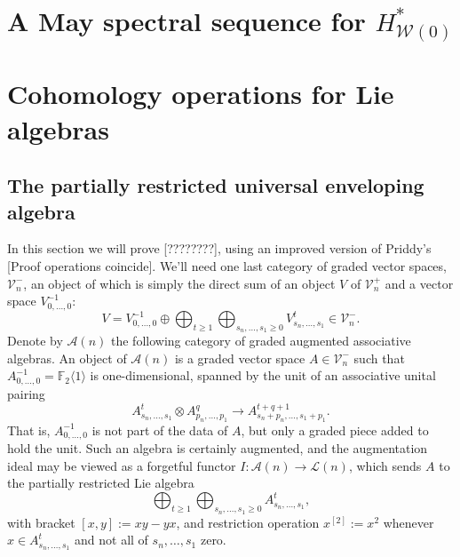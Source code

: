 \documentclass[11pt]{amsart}
\theoremstyle{plain}
\theoremstyle{definition}
\renewcommand{\to}{\longrightarrow}
\newcommand{\calW}{\mathcal{W}}
\newcommand{\calA}{\mathcal{A}}
\newcommand{\calL}{\mathcal{L}}
\newcommand{\calV}{\mathcal{V}}
\theoremstyle{plain}
\newcommand{\restn}[1]{#1^{[2]}}
\newcommand{\vect}[2]{\calV^{#1}_{#2}}
\newcommand{\F}{\mathbb{F}}
\begin{document}
\appendix
\begin{appendices}
\vfil\pagebreak

\section{\textbf{A May spectral sequence for $H^*_{\calW(0)}$}}

\section{\textbf{Cohomology operations for Lie algebras}}\label{appendix on Lie coh ops}
\subsection{The partially restricted universal enveloping algebra}
In this section we will prove [????????], using an improved version of Priddy's [Proof operations coincide]. We'll need one last category of graded vector spaces, $\vect{-}{n}$, an object of which is simply the direct sum of an object $V$ of $\vect{+}{n}$ and a vector space $V_{0,\ldots,0}^{-1}$:
\[V=V^{-1}_{0,\ldots,0}\oplus\bigoplus_{t\geq{1}}\bigoplus_{s_n,\ldots,s_1\geq0}V^t_{s_n,\ldots,s_1}\in\vect{-}{n}.\]
Denote by $\calA(n)$ the following category of graded augmented associative algebras. An object of $\calA(n)$ is a graded vector space
$A\in \vect{-}{n}$ such that $A^{-1}_{0,\ldots,0}=\F_2\langle 1\rangle$ is one-dimensional, spanned by the unit of an associative unital pairing
\[A^{t}_{s_n,\ldots,s_1}\otimes A^{q}_{p_n,\ldots,p_1}\to A^{t+q+1}_{s_n+p_n,\ldots,s_1+p_1}.\]
That is, $A_{0,\ldots,0}^{-1}$ is not part of the data of $A$, but only a graded piece added to hold the unit. Such an algebra is certainly augmented, and the augmentation ideal may be viewed as a forgetful functor $I:\calA(n)\to\calL(n)$, which sends $A$ to the partially restricted Lie algebra
\[\bigoplus_{t\geq{1}}\bigoplus_{s_n,\ldots,s_1\geq0}A^t_{s_n,\ldots,s_1},\]
with bracket $[x,y]:=xy-yx$, and restriction operation $\restn{x}:=x^2$ whenever $x\in A^t_{s_n,\ldots,s_1}$ and not all of $s_n,\ldots,s_1$ zero.


\end{appendices}
\end{document}

